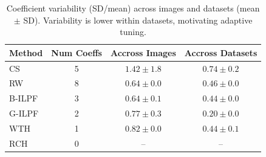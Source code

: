 \documentclass[iucr]{iucrjournals}
\begin{document}

\begin{table}[t]
\centering
\small
\caption{Coefficient variability (SD/mean) across images and datasets (mean $\pm$ SD). Variability is lower within datasets, motivating adaptive tuning.}
\label{tab:summary_total_variability}
\begin{tabular}{@{}lccc@{}}
\toprule
Method & Num Coeffs & Accross Images & Accross Datasets \\
\midrule
CS   & 5 & $1.42 \pm 1.8$ & $0.74 \pm 0.2$ \\
RW   & 8 & $0.64 \pm 0.0$ & $0.46 \pm 0.0$ \\
B-ILPF & 3 & $0.64 \pm 0.1$ & $0.44 \pm 0.0$ \\
G-ILPF   & 2 & $0.77 \pm 0.3$ & $0.20 \pm 0.0$ \\
WTH  & 1 & $0.82 \pm 0.0$ & $0.44 \pm 0.1$ \\
RCH  & 0 & --  & --  \\
\bottomrule
\end{tabular}
\end{table}
\end{document}
